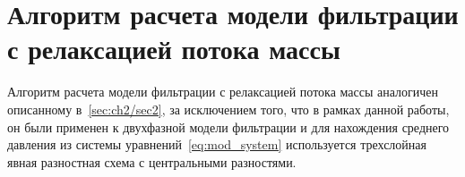 \section{Алгоритм расчета модели фильтрации с релаксацией потока массы} \label{sec:ch2/sec3}

Алгоритм расчета модели фильтрации с релаксацией потока массы аналогичен описанному в~\ref{sec:ch2/sec2}, за исключением того, что в рамках данной работы, он были применен к двухфазной модели фильтрации и для нахождения среднего давления из системы уравнений~\eqref{eq:mod_system} используется трехслойная явная разностная схема с центральными разностями. 
